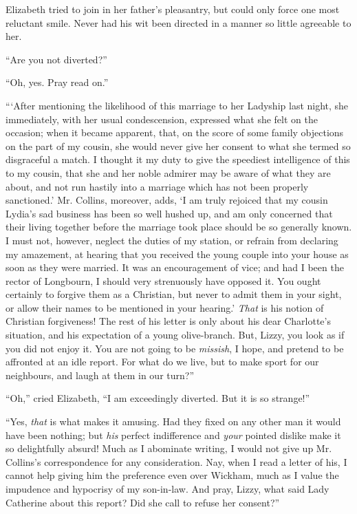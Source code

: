Elizabeth tried to join in her father's pleasantry, but could only force one most reluctant smile. Never had his wit been directed in a manner so little agreeable to her.

``Are you not diverted?''

``Oh, yes. Pray read on.''

```After mentioning the likelihood of this marriage to her Ladyship last night, she immediately, with her usual condescension, expressed what she felt on the occasion; when it became apparent, that, on the score of some family objections on the part of my cousin, she would never give her consent to what she termed so disgraceful a match. I thought it my duty to give the speediest intelligence of this to my cousin, that she and her noble admirer may be aware of what they are about, and not run hastily into a marriage which has not been properly sanctioned.' Mr. Collins, moreover, adds, `I am truly rejoiced that my cousin Lydia's sad business has been so well hushed up, and am only concerned that their living together before the marriage took place should be so generally known. I must not, however, neglect the duties of my station, or refrain from declaring my amazement, at hearing that you received the young couple into your house as soon as they were married. It was an encouragement of vice; and had I been the rector of Longbourn, I should very strenuously have opposed it. You ought certainly to forgive them as a Christian, but never to admit them in your sight, or allow their names to be mentioned in your hearing.' \textit{That} is his notion of Christian forgiveness! The rest of his letter is only about his dear Charlotte's situation, and his expectation of a young olive-branch. But, Lizzy, you look as if you did not enjoy it. You are not going to be \textit{missish}, I hope, and pretend to be affronted at an idle report. For what do we live, but to make sport for our neighbours, and laugh at them in our turn?''

``Oh,'' cried Elizabeth, ``I am exceedingly diverted. But it is so strange!''

``Yes, \textit{that} is what makes it amusing. Had they fixed on any other man it would have been nothing; but \textit{his} perfect indifference and \textit{your} pointed dislike make it so delightfully absurd! Much as I abominate writing, I would not give up Mr. Collins's correspondence for any consideration. Nay, when I read a letter of his, I cannot help giving him the preference even over Wickham, much as I value the impudence and hypocrisy of my son-in-law. And pray, Lizzy, what said Lady Catherine about this report? Did she call to refuse her consent?''

